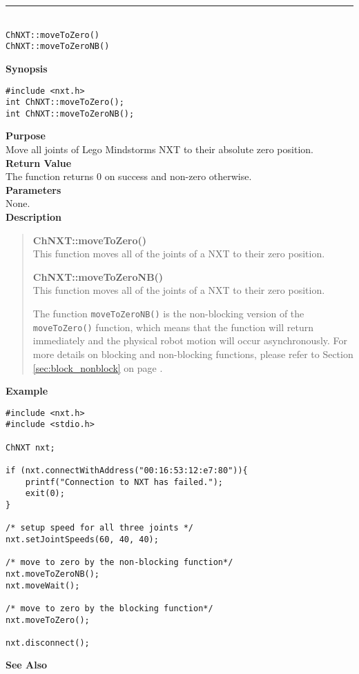 \noindent
\vspace{5pt}
\rule{4.5in}{0.015in}\\
\noindent
{\LARGE \texttt{ChNXT::moveToZero()} }\\
{\LARGE \texttt{ChNXT::moveToZeroNB()} }\\


\noindent
{\bf Synopsis}
\vspace{-8pt}
\begin{verbatim}
#include <nxt.h>
int ChNXT::moveToZero();
int ChNXT::moveToZeroNB();
\end{verbatim}

\noindent
{\bf Purpose}\\
Move all joints of Lego Mindstorms NXT to their absolute zero position. \\

\noindent
{\bf Return Value}\\
The function returns 0 on success and non-zero otherwise.\\

\noindent
{\bf Parameters}\\
None.\\

\noindent
{\bf Description}\\
\vspace{-12pt}
\begin{quote}
{\bf ChNXT::moveToZero()}\\
This function moves all of the joints of a NXT to their zero 
position.

{\bf ChNXT::moveToZeroNB()}\\
This function moves all of the joints of a NXT to their zero 
position.

The function \texttt{moveToZeroNB()} is the non-blocking version 
of the \texttt{moveToZero()} function, which means that the 
function will return immediately and the physical robot motion 
will occur asynchronously. For more details on blocking and 
non-blocking functions, please refer to Section \ref{sec:block_nonblock}
on page \pageref{sec:block_nonblock}.\\
\end{quote}

\noindent
{\bf Example}
\begin{verbatim}
#include <nxt.h> 
#include <stdio.h>

ChNXT nxt;

if (nxt.connectWithAddress("00:16:53:12:e7:80")){
    printf("Connection to NXT has failed.");
    exit(0);
}
 
/* setup speed for all three joints */
nxt.setJointSpeeds(60, 40, 40);

/* move to zero by the non-blocking function*/
nxt.moveToZeroNB();
nxt.moveWait();

/* move to zero by the blocking function*/
nxt.moveToZero();

nxt.disconnect();
\end{verbatim}

\noindent
{\bf See Also}\\
